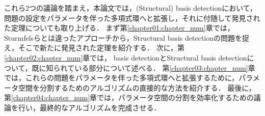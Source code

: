 \par
これら$2$つの議論を踏まえ，本論文では，(Structural) \groebner{} basis detectionにおいて，問題の設定をパラメータを伴った多項式環へと拡張し，それに付随して発見された定理についても取り上げる．
まず第\ref{chapter01:chapter_num}章では，Sturmfelsらとは違ったアプローチから，Structural \groebner{} basis detectionの問題を捉え，そこで新たに発見された定理を紹介する．
次に，第\ref{chapter02:chapter_num}章では，\groebner{} basis detectionとStructural \groebner{} basis detectionについて，既に知られている部分について述べる．
第\ref{chapter03:chapter_num}章では，これらの問題をパラメータを伴った多項式環へと拡張するために，パラメータ空間を分割するためのアルゴリズムの直接的な方法を紹介する．
最後に，第\ref{chapter04:chapter_num}章では，パラメータ空間の分割を効率化するための議論を行い，最終的なアルゴリズムを完成させる．
